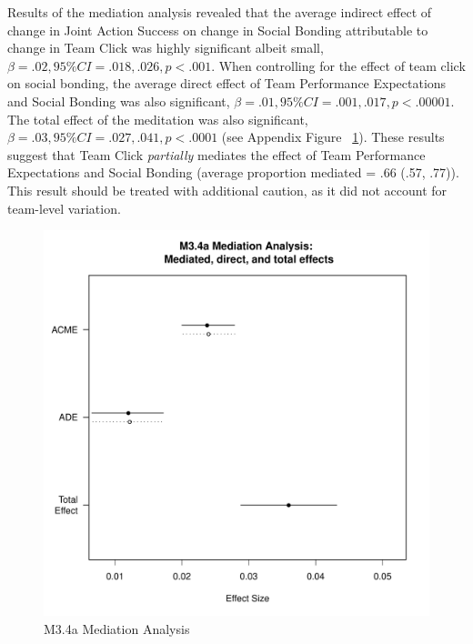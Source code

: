 \begin{landscape}
    Results of the mediation analysis revealed that the average indirect effect of change in Joint Action Success on change in Social Bonding attributable to change in Team Click was highly significant albeit small, $\beta = .02, 95\% CI = .018 , .026, p < .001$.  When controlling for the effect of team click on social bonding, the average direct effect of Team Performance Expectations and Social Bonding was also significant, $\beta = .01, 95\% CI = .001 , .017, p < .00001$.  The total effect of the meditation was also significant, $\beta = .03, 95\% CI = .027, .041, p < .0001$ (see Appendix Figure ~\ref{fig:MLM34aMediationAnalysis}).
    These results suggest that Team Click \textit{partially} mediates the effect of Team Performance Expectations and Social Bonding (average proportion mediated = .66 (.57, .77)).  This result should be treated with additional caution, as it did not account for team-level variation.


    \begin{figure}[htbp]
      \includegraphics[width =\columnwidth]{images/MLM34aMediationAnalysis.pdf}
      \caption{M3.4a Mediation Analysis}
      \label{fig:MLM34aMediationAnalysis}
    \end{figure}




\clearpage


























\end{landscape}
